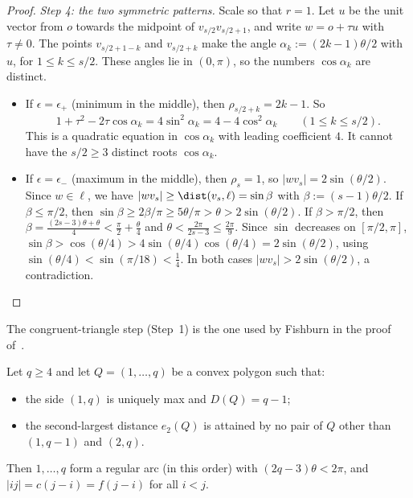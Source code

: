 \begin{proof}
\emph{Step 4: the two symmetric patterns.} Scale so that $r=1$. Let $u$ be the unit vector from $o$ towards the midpoint of $v_{s/2}v_{s/2+1}$, and write $w=o+\tau u$ with $\tau\ne0$. The points $v_{s/2+1-k}$ and $v_{s/2+k}$ make the angle $\alpha_k:=(2k-1)\theta/2$ with $u$, for $1\le k\le s/2$. These angles lie in $(0,\pi)$, so the numbers $\cos\alpha_k$ are distinct.
\begin{itemize}[leftmargin=2em]
\item If $\epsilon=\epsilon_+$ (minimum in the middle), then $\rho_{s/2+k}=2k-1$. So
\[
1+\tau^2-2\tau\cos\alpha_k=4\sin^2\alpha_k=4-4\cos^2\alpha_k\qquad(1\le k\le s/2).
\]
This is a quadratic equation in $\cos\alpha_k$ with leading coefficient $4$. It cannot have the $s/2\ge3$ distinct roots $\cos\alpha_k$.
\item If $\epsilon=\epsilon_-$ (maximum in the middle), then $\rho_s=1$, so $|wv_s|=2\sin(\theta/2)$. Since $w\in\ell$, we have $|wv_s|\ge\dist(v_s,\ell)=\sin\beta$ with $\beta:=(s-1)\theta/2$. If $\beta\le\pi/2$, then $\sin\beta\ge2\beta/\pi\ge5\theta/\pi>\theta>2\sin(\theta/2)$. If $\beta>\pi/2$, then $\beta=\frac{(2s-3)\theta+\theta}{4}<\frac\pi2+\frac\theta4$ and $\theta<\frac{2\pi}{2s-3}\le\frac{2\pi}9$. Since $\sin$ decreases on $[\pi/2,\pi]$, $\sin\beta>\cos(\theta/4)>4\sin(\theta/4)\cos(\theta/4)=2\sin(\theta/2)$, using $\sin(\theta/4)<\sin(\pi/18)<\tfrac14$. In both cases $|wv_s|>2\sin(\theta/2)$, a contradiction.\qedhere
\end{itemize}
\end{proof}

The congruent-triangle step (Step~1) is the one used by Fishburn in the proof of~\cite[Lemma~8]{Fi95}.

\begin{proposition}\label{prop:ladder}
Let $q\ge4$ and let $Q=(1,\dots,q)$ be a convex polygon such that:
\begin{itemize}[leftmargin=2em]
\item the side $(1,q)$ is uniquely max and $D(Q)=q-1$;
\item the second-largest distance $e_2(Q)$ is attained by no pair of $Q$ other than $(1,q-1)$ and $(2,q)$.
\end{itemize}
Then $1,\dots,q$ form a regular arc (in this order) with $(2q-3)\theta<2\pi$, and $|ij|=c(j-i)=f(j-i)$ for all $i<j$.
\end{proposition}

